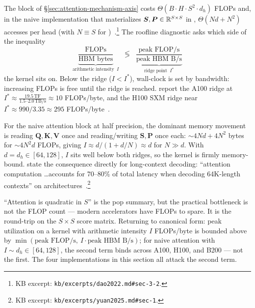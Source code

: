 The  block of \S\ref{sec:attention-mechanism-axis}
costs $\Theta(B \cdot H \cdot S^2 \cdot d_h)$ FLOPs and, in the naive
implementation that materializes
$\boldsymbol{S}, \boldsymbol{P} \in \mathbb{R}^{S \times S}$ in ,
$\Theta(N d + N^2)$  accesses per head (with $N \equiv S$ for
)~\citep[\S 3.2 Thm.\ 2]{dao2022}.\footnote{KB excerpt:
\texttt{kb/excerpts/dao2022.md\#sec-3-2}.} The roofline diagnostic
asks which side of the inequality
\begin{equation}
  \underbrace{\frac{\text{FLOPs}}{\text{HBM bytes}}}_{\text{arithmetic intensity }\ I}
  \;\;\lessgtr\;\;
  \underbrace{\frac{\text{peak FLOP/s}}{\text{peak HBM B/s}}}_{\text{ridge point }\ I^*}
  \label{eq:roofline}
\end{equation}
the kernel sits on. Below the ridge ($I < I^*$), wall-clock is set by
 bandwidth: increasing FLOPs is free until the ridge is reached.
\citet{dao2022} report the A100 ridge at $I^* \approx
\tfrac{19.5\,\text{TF}}{1.5\text{--}2.0\,\text{TB/s}} \approx 10$
FLOPs/byte, and the H100 SXM ridge near $I^* \approx 990 / 3.35
\approx 295$ FLOPs/byte~\citep[\S 2.1]{dao2022}\citep[\S 1]{shah2024}.

For the naive attention block at half precision, the dominant memory
movement is reading $\boldsymbol{Q}, \boldsymbol{K}, \boldsymbol{V}$ once
and reading/writing $\boldsymbol{S}, \boldsymbol{P}$ once each:
$\sim\!4 N d + 4 N^2$ bytes for $\sim\!4 N^2 d$ FLOPs, giving
$I \approx d / (1 + d/N) \approx d$ for $N \gg d$. With $d = d_h \in
[64, 128]$, $I$ sits well below both ridges, so the kernel is
firmly memory-bound. \citet{yuan2025} state the consequence directly
for long-context decoding: ``attention computation \dots accounts for
70--80\% of total latency when decoding 64K-length contexts'' on
 architectures~\citep[\S 1]{yuan2025}.\footnote{KB excerpt:
\texttt{kb/excerpts/yuan2025.md\#sec-1}.}

\begin{intuition}
``Attention is quadratic in $S$'' is the pop summary, but the
practical bottleneck is not the FLOP count --- modern accelerators have
FLOPs to spare. It is the  round-trip on the $S \times S$ score
matrix. Returning to canonical form: peak utilization on a kernel with
arithmetic intensity $I$ FLOPs/byte is bounded above by
$\min(\text{peak FLOP/s},\ I \cdot \text{peak HBM B/s})$; for naive
attention with $I \sim d_h \in [64, 128]$, the second term binds
across A100, H100, and B200 --- not the first. The four implementations
in this section all attack the second term.
\end{intuition}

